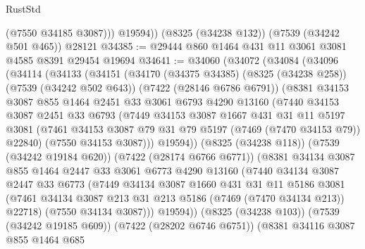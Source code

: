 \begin{lexlean}{RustStd}
\begin{coremodule}
            (@7550 @34185 @3087)))
        @19594))
    (@8325 (@34238 @132))
    (@7539 (@34242 @501 @465))
    @28121
@34385 := @29444 @860 @1464 @431 @11 @3061 @3081 @4585 @8391 @29454 @19694
@34641 := @34060
    (@34072
      (@34084
        (@34096
          (@34114
            (@34133
              (@34151
                (@34170
                  (@34375 @34385)
                  (@8325 (@34238 @258))
                  (@7539 (@34242 @502 @643))
                  (@7422 (@28146 @6786 @6791))
                  (@8381
                    @34153
                    @3087
                    @855
                    @1464
                    @2451
                    @33
                    @3061
                    @6793
                    @4290
                    @13160
                    (@7440
                      @34153
                      @3087
                      @2451
                      @33
                      @6793
                      (@7449
                        @34153
                        @3087
                        @1667
                        @431
                        @31
                        @11
                        @5197
                        @3081
                        (@7461 @34153 @3087 @79 @31 @79 @5197 (@7469 (@7470 @34153 @79)) @22840)
                        (@7550 @34153 @3087)))
                    @19594))
                (@8325 (@34238 @118))
                (@7539 (@34242 @19184 @620))
                (@7422 (@28174 @6766 @6771))
                (@8381
                  @34134
                  @3087
                  @855
                  @1464
                  @2447
                  @33
                  @3061
                  @6773
                  @4290
                  @13160
                  (@7440
                    @34134
                    @3087
                    @2447
                    @33
                    @6773
                    (@7449
                      @34134
                      @3087
                      @1660
                      @431
                      @31
                      @11
                      @5186
                      @3081
                      (@7461 @34134 @3087 @213 @31 @213 @5186 (@7469 (@7470 @34134 @213)) @22718)
                      (@7550 @34134 @3087)))
                  @19594))
              (@8325 (@34238 @103))
              (@7539 (@34242 @19185 @609))
              (@7422 (@28202 @6746 @6751))
              (@8381
                @34116
                @3087
                @855
                @1464
                @685

\end{coremodule}
\end{lexlean}
